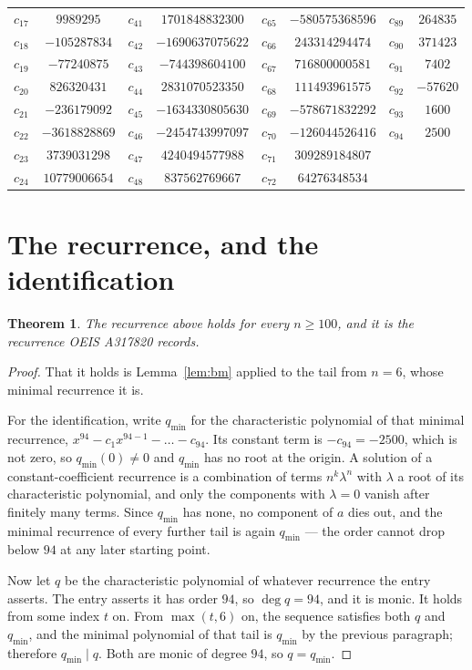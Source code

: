 \documentclass[11pt,a4paper]{article}
\theoremstyle{plain}
\newtheorem{theorem}{Theorem}
\theoremstyle{definition}
\begin{document}
\begin{center}
\begin{tabular}{cccccccc}
$c_{17}$ & $9989295$ & $c_{41}$ & $1701848832300$ & $c_{65}$ & $-580575368596$ & $c_{89}$ & $264835$ \\
$c_{18}$ & $-105287834$ & $c_{42}$ & $-1690637075622$ & $c_{66}$ & $243314294474$ & $c_{90}$ & $371423$ \\
$c_{19}$ & $-77240875$ & $c_{43}$ & $-744398604100$ & $c_{67}$ & $716800000581$ & $c_{91}$ & $7402$ \\
$c_{20}$ & $826320431$ & $c_{44}$ & $2831070523350$ & $c_{68}$ & $111493961575$ & $c_{92}$ & $-57620$ \\
$c_{21}$ & $-236179092$ & $c_{45}$ & $-1634330805630$ & $c_{69}$ & $-578671832292$ & $c_{93}$ & $1600$ \\
$c_{22}$ & $-3618828869$ & $c_{46}$ & $-2454743997097$ & $c_{70}$ & $-126044526416$ & $c_{94}$ & $2500$ \\
$c_{23}$ & $3739031298$ & $c_{47}$ & $4240494577988$ & $c_{71}$ & $309289184807$ &  &  \\
$c_{24}$ & $10779006654$ & $c_{48}$ & $837562769667$ & $c_{72}$ & $64276348534$ &  &  \\
\end{tabular}
\end{center}

\section{The recurrence, and the identification}

\begin{theorem}
The recurrence above holds for every $n\ge100$, and it is the recurrence OEIS A317820 records.
\end{theorem}

\begin{proof}
That it holds is Lemma~\ref{lem:bm} applied to the tail from $n=6$, whose minimal
recurrence it is.

For the identification, write $q_{\min}$ for the characteristic polynomial of that minimal
recurrence, $x^{94}-c_1x^{94-1}-\dots-c_{94}$. Its constant term is
$-c_{94}=-2500$, which is not zero, so $q_{\min}(0)\neq0$ and $q_{\min}$ has no
root at the origin. A solution of a constant-coefficient recurrence is a combination of terms
$n^{k}\lambda^{n}$ with $\lambda$ a root of its characteristic polynomial, and only the
components with $\lambda=0$ vanish after finitely many terms. Since $q_{\min}$ has none, no
component of $a$ dies out, and the minimal recurrence of every further tail is again
$q_{\min}$ --- the order cannot drop below $94$ at any later starting point.

Now let $q$ be the characteristic polynomial of whatever recurrence the entry asserts. The
entry asserts it has order $94$, so $\deg q=94$, and it is monic. It holds from some
index $t$ on. From $\max(t,6)$ on, the sequence satisfies both $q$ and $q_{\min}$, and
the minimal polynomial of that tail is $q_{\min}$ by the previous paragraph; therefore
$q_{\min}\mid q$. Both are monic of degree $94$, so $q=q_{\min}$.
\end{proof}
\end{document}
